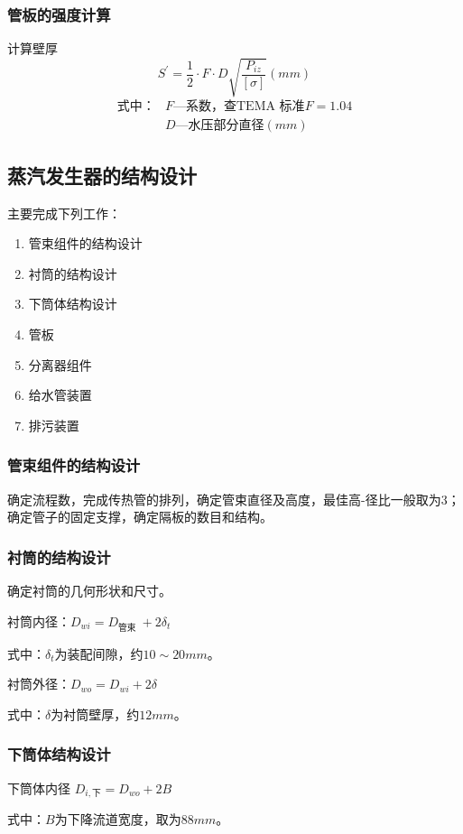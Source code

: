 \subsubsection{管板的强度计算}
计算壁厚
\begin{equation*}
    S^{\prime}=\frac{1}{2} \cdot F \cdot D \sqrt{\frac{P_{i z}}{[\sigma]}} (mm)
\end{equation*}
\begin{align*}
    \text{式中：} & F \text{—系数，查TEMA 标准}F=1.04 \\
                  & D \text{—水压部分直径} (mm)
\end{align*}

\subsection{蒸汽发生器的结构设计}
主要完成下列工作：
\begin{enumerate}
    \item 管束组件的结构设计
    \item 衬筒的结构设计
    \item 下筒体结构设计
    \item 管板
    \item 分离器组件
    \item 给水管装置
    \item 排污装置
\end{enumerate}

\subsubsection{管束组件的结构设计}
确定流程数，完成传热管的排列，确定管束直径及高度，最佳高-径比一般取为3；确定管子的固定支撑，确定隔板的数目和结构。

\subsubsection{衬筒的结构设计}
确定衬筒的几何形状和尺寸。
\par 衬筒内径：$ D_{w i}=D_{\text {管束 }}+2 \delta_{t} $
\par 式中：$ \delta_t $为装配间隙，约$ 10 \sim 20 mm $。
\par 衬筒外径：$ D_{w o}=D_{w i}+2 \delta $
\par 式中：$ \delta $为衬筒壁厚，约$ 12 mm $。

\subsubsection{下筒体结构设计}
下筒体内径 $ D_{i, \text{下}}=D_{w o}+2 B $
\par 式中：$ B $为下降流道宽度，取为$ 88 mm $。

